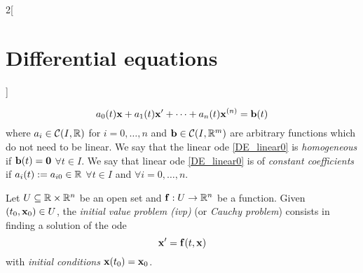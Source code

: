 \documentclass[../../../main.tex]{subfiles}
\begin{document}
\begin{multicols}{2}[\section{Differential equations}]
\begin{definition}
    \begin{equation}\label{DE_linear0}
      a_0(t)\boldsymbol{\mathrm{x}}+a_1(t)\boldsymbol{\mathrm{x}}'+\cdots+a_n(t)\boldsymbol{\mathrm{x}}^{(n)}=\boldsymbol{\mathrm{b}}(t)
    \end{equation}
    where $a_i\in\mathcal{C}(I,\mathbb{R})$ for $i=0,\ldots,n$ and $\boldsymbol{\mathrm{b}}\in\mathcal{C}(I,\mathbb{R}^m)$ are arbitrary functions which do not need to be linear. We say that the linear ode \eqref{DE_linear0} is \textit{homogeneous} if $\boldsymbol{\mathrm{b}}(t)=\boldsymbol{\mathrm{0}}$ $\forall t\in I$. We say that linear ode \eqref{DE_linear0} is of \textit{constant coefficients} if $a_i(t):=a_{i0}\in\mathbb{R}$ $\forall t\in I$ and $\forall i=0,\ldots,n$.
  \end{definition}
  \begin{definition}
    Let $U\subseteq\mathbb{R}\times\mathbb{R}^n$ be an open set and $\boldsymbol{\mathrm{f}}:U\rightarrow\mathbb{R}^n$ be a function. Given $(t_0,\boldsymbol{\mathrm{x}}_0)\in U$, the \textit{initial value problem (ivp)} (or \textit{Cauchy problem}) consists in finding a solution of the ode $$\boldsymbol{\mathrm{x}}'=\boldsymbol{\mathrm{f}}(t,\boldsymbol{\mathrm{x}})$$ with \textit{initial conditions} $\boldsymbol{\mathrm{x}}(t_0)=\boldsymbol{\mathrm{x}}_0$.
  \end{definition}

\end{multicols}
\end{document}

